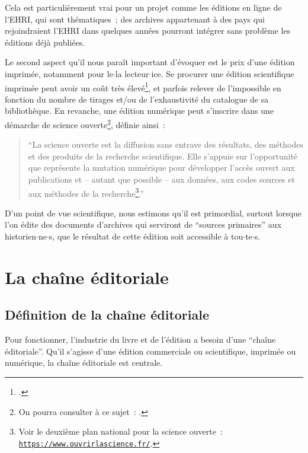 Cela est particulièrement vrai pour un projet comme les éditions en ligne de l'EHRI, qui sont thématiques~; des archives appartenant à des pays qui rejoindraient l'EHRI dans quelques années pourront intégrer sans problème les éditions déjà publiées.  

Le second aspect qu'il nous paraît important d'évoquer est le prix d'une édition imprimée, notamment pour le$\cdot$la lecteur$\cdot$ice. Se procurer une édition scientifique imprimée peut avoir un coût très élevé\footcite[p.~210]{Pierazzo2019}, et parfois relever de l'impossible en fonction du nombre de tirages et/ou de l'exhaustivité du catalogue de sa bibliothèque. En revanche, une édition numérique peut s'inscrire dans une démarche de science ouverte\footnote{On pourra consulter à ce sujet~: \cite{Romary2016}.}, définie ainsi~:

\begin{quote}
    \enquote{La science ouverte est la diffusion sans entrave des résultats, des méthodes et des produits de la recherche scientifique. Elle s’appuie sur l’opportunité que représente la mutation numérique pour développer l’accès ouvert aux publications et – autant que possible – aux données, aux codes sources et aux méthodes de la recherche\footnote{Voir le deuxième plan national pour la science ouverte~: \texttt{\href{https://www.ouvrirlascience.fr/deuxieme-plan-national-pour-la-science-ouverte-pnso/}{https://www.ouvrirlascience.fr/}}.}.}
\end{quote}

D'un point de vue scientifique, nous estimons qu'il est primordial, surtout lorsque l'on édite des documents d'archives qui serviront de \enquote{sources primaires} aux historien$\cdot$ne$\cdot$s, que le résultat de cette édition soit accessible à tou$\cdot$te$\cdot$s.



\section{La chaîne éditoriale}

\subsection{Définition de la chaîne éditoriale}
Pour fonctionner, l'industrie du livre et de l'édition a besoin d'une \enquote{chaîne éditoriale}. Qu'il s'agisse d'une édition commerciale ou scientifique, imprimée ou numérique, la chaîne éditoriale est centrale.  

